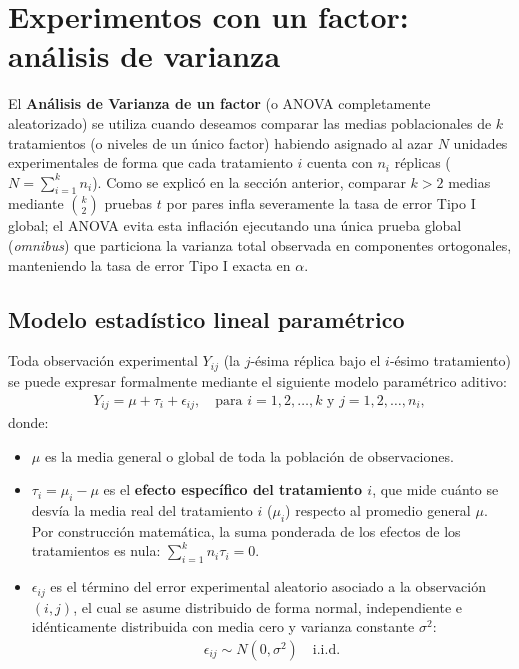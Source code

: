 \section{Experimentos con un factor: análisis de varianza}

El \textbf{Análisis de Varianza de un factor} (o ANOVA completamente aleatorizado) se utiliza cuando deseamos comparar las medias poblacionales de $k$ tratamientos (o niveles de un único factor) habiendo asignado al azar $N$ unidades experimentales de forma que cada tratamiento $i$ cuenta con $n_i$ réplicas ($N = \sum_{i=1}^k n_i$). Como se explicó en la sección anterior, comparar $k>2$ medias mediante $\binom{k}{2}$ pruebas $t$ por pares infla severamente la tasa de error Tipo I global; el ANOVA evita esta inflación ejecutando una única prueba global (\emph{omnibus}) que particiona la varianza total observada en componentes ortogonales, manteniendo la tasa de error Tipo I exacta en $\alpha$.

\subsection{Modelo estadístico lineal paramétrico}

Toda observación experimental $Y_{ij}$ (la $j$-ésima réplica bajo el $i$-ésimo tratamiento) se puede expresar formalmente mediante el siguiente modelo paramétrico aditivo:
\begin{align}
	Y_{ij} = \mu + \tau_i + \epsilon_{ij}, \quad \text{para } i = 1, 2, \ldots, k \text{ y } j = 1, 2, \ldots, n_i,
	\label{eq:modelo_anova1}
\end{align}
donde:
\begin{itemize}
	\item $\mu$ es la media general o global de toda la población de observaciones.
	\item $\tau_i = \mu_i - \mu$ es el \textbf{efecto específico del tratamiento $i$}, que mide cuánto se desvía la media real del tratamiento $i$ ($\mu_i$) respecto al promedio general $\mu$. Por construcción matemática, la suma ponderada de los efectos de los tratamientos es nula: $\sum_{i=1}^k n_i \tau_i = 0$.
	\item $\epsilon_{ij}$ es el término del error experimental aleatorio asociado a la observación $(i,j)$, el cual se asume distribuido de forma normal, independiente e idénticamente distribuida con media cero y varianza constante $\sigma^2$:
	\begin{align}
		\epsilon_{ij} \sim N(0, \sigma^2) \quad \text{i.i.d.}
	\end{align}
\end{itemize}

